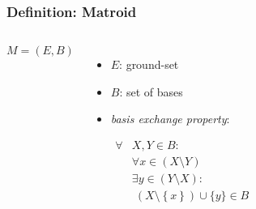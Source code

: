 \documentclass{beamer}
\newcommand{\set}[1]{\left\{#1\right\}}
\begin{document}
\begin{frame}
  \frametitle{Definition: Matroid}
  \begin{columns}
    \begin{equation*}
      M = (E, B)
    \end{equation*}
    \vspace{-0.8cm}
    \begin{itemize}
      \item $E$: ground-set
      \item $B$: set of bases
      \item \emph{basis exchange property}:
        \vspace{-1cm}
        \begin{center}
          \begin{align*}
            \forall &X, Y\in B:\\
            &\forall x\in (X\setminus Y)\\
            &\exists y\in (Y\setminus X):\\
            &\;(X\setminus \set{x})\cup\{y\}\in B
          \end{align*}
        \end{center}
    \end{itemize}
    \begin{center}
    \end{center}
  \end{columns}
\end{frame}
\end{document}
